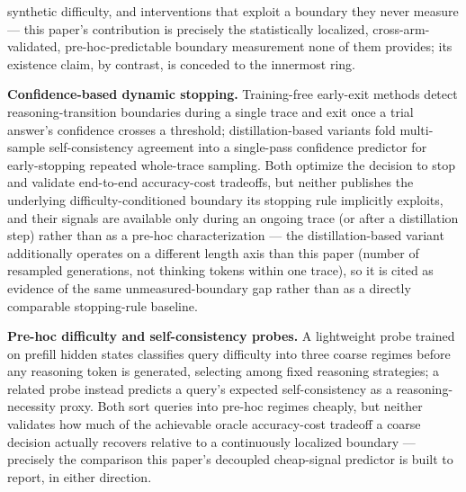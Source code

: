 \documentclass[11pt]{article}
\begin{document}
synthetic difficulty, and interventions that exploit a boundary they never measure --- this paper's contribution is precisely the statistically localized, cross-arm-validated, pre-hoc-predictable boundary measurement none of them provides; its existence claim, by contrast, is conceded to the innermost ring.

\textbf{Confidence-based dynamic stopping.} Training-free early-exit methods \cite{DEERNpU7} detect reasoning-transition boundaries during a single trace and exit once a trial answer's confidence crosses a threshold; distillation-based variants \cite{CaTSjrSc4} fold multi-sample self-consistency agreement into a single-pass confidence predictor for early-stopping repeated whole-trace sampling. Both optimize the decision to stop and validate end-to-end accuracy-cost tradeoffs, but neither publishes the underlying difficulty-conditioned boundary its stopping rule implicitly exploits, and their signals are available only during an ongoing trace (or after a distillation step) rather than as a pre-hoc characterization --- the distillation-based variant additionally operates on a different length axis than this paper (number of resampled generations, not thinking tokens within one trace), so it is cited as evidence of the same unmeasured-boundary gap rather than as a directly comparable stopping-rule baseline.

\textbf{Pre-hoc difficulty and self-consistency probes.} A lightweight probe trained on prefill hidden states \cite{DiffAdapt644F} classifies query difficulty into three coarse regimes before any reasoning token is generated, selecting among fixed reasoning strategies; a related probe \cite{AdaptiveThinking2i6R} instead predicts a query's expected self-consistency as a reasoning-necessity proxy. Both sort queries into pre-hoc regimes cheaply, but neither validates how much of the achievable oracle accuracy-cost tradeoff a coarse decision actually recovers relative to a continuously localized boundary --- precisely the comparison this paper's decoupled cheap-signal predictor is built to report, in either direction.
\end{document}
